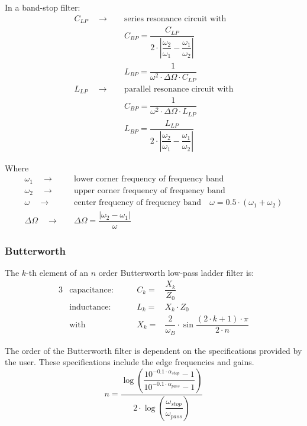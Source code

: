 \addvspace{12pt}

In a band-stop filter:
\begin{align}
C_{LP} \quad \rightarrow \quad & \text{series resonance circuit with} \\
       & C_{BP} = \dfrac{C_{LP}}{2\cdot\left| \dfrac{\omega_2}{\omega_1} - \dfrac{\omega_1}{\omega_2} \right| } \\
       & L_{BP} = \dfrac{1}{\omega^2\cdot \Delta\Omega\cdot C_{LP}} \\
L_{LP} \quad \rightarrow \quad & \text{parallel resonance circuit with} \\
       & C_{BP} = \dfrac{1}{\omega^2\cdot \Delta\Omega\cdot L_{LP}} \\
       & L_{BP} = \dfrac{L_{LP}}{2\cdot\left| \dfrac{\omega_2}{\omega_1} - \dfrac{\omega_1}{\omega_2} \right| }
\end{align}

\addvspace{12pt}

Where
\begin{align}
\omega_1 \quad\rightarrow\quad & \text{lower corner frequency of frequency band} \\
\omega_2 \quad\rightarrow\quad & \text{upper corner frequency of frequency band} \\
\omega   \quad\rightarrow\quad & \text{center frequency of frequency band} \quad \omega = 0.5\cdot (\omega_1 + \omega_2) \\
\Delta\Omega \quad\rightarrow\quad & \Delta\Omega = \dfrac{|\omega_2 - \omega_1|}{\omega}
\end{align}

\subsubsection{Butterworth}

The $k$-th element of an $n$ order Butterworth low-pass ladder filter is:
\begin{alignat}{3}
 & \text{capacitance:} \qquad & C_k = & \dfrac{X_k}{Z_0} \\
 & \text{inductance:}  \qquad & L_k = & X_k \cdot Z_0 \\
 & \text{with}         \qquad & X_k = & \dfrac{2}{\omega_B} \cdot \sin \dfrac{(2\cdot k + 1)\cdot\pi}{2\cdot n}
\end{alignat}

The order of the Butterworth filter is dependent on the specifications
provided by the user.  These specifications include the edge
frequencies and gains.
\begin{equation}
\label{eq:ButtOrder}
n = \dfrac{\log{\left(\dfrac{10^{-0.1\cdot \alpha_{stop}} - 1}{10^{-0.1\cdot \alpha_{pass}} - 1}\right)}}{2\cdot\log{\left(\dfrac{\omega_{stop}}{\omega_{pass}}\right)}}
\end{equation}

